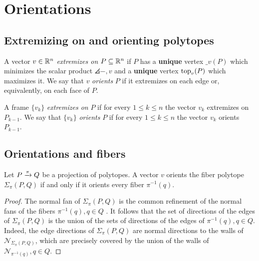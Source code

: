 
\section{Orientations}


\subsection{Extremizing on and orienting polytopes} 

A vector $v \in \mathbb{R}^n$ \textit{extremizes on} $P \subseteq \mathbb{R}^n$ if $P$ has a \textbf{unique} vertex $\bm_v(P)$ which minimizes the scalar product $\angles{-,v}$ and a \textbf{unique} vertex $\operatorname{top}_v(P)$ which maximizes it.
We say that $v$ \textit{orients} $P$ if it extremizes on each edge or, equivalently, on each face of $P$.

A frame $\{v_k\}$ \textit{extremizes on} $P$ if for every $1 \leq k \leq n$ the vector $v_k$ extremizes on $P_{k-1}$.
We say that $\{v_k\}$ \textit{orients} $P$ if for every $1 \leq k \leq n$ the vector $v_k$ orients $P_{k-1}$.



\subsection{Orientations and fibers}

\begin{lemma} \label{l:orients-the-fibers}
	Let $P \xrightarrow{\pi} Q$ be a projection of polytopes.
	A vector $v$ orients the fiber polytope $\Sigma_\pi(P, Q)$ if and only if it orients every fiber $\pi^{-1}(q)$.
\end{lemma}

\begin{proof}
	The normal fan of $\Sigma_\pi(P,Q)$ is the common refinement of the normal fans of the fibers $\pi^{-1}(q), q \in Q$ \cite[Proposition 2.2]{BilleraSturmfels94}.
	It follows that the set of directions of the edges of $\Sigma_\pi(P,Q)$ is the union of the sets of directions of the edges of $\pi^{-1}(q), q \in Q$.
	Indeed, the edge directions of $\Sigma_\pi(P,Q)$ are normal directions to the walls of $\mathcal{N}_{\Sigma_\pi(P,Q)}$, which are precisely covered by the union of the walls of $\mathcal{N}_{\pi^{-1}(q)}, q \in Q$.
\end{proof}

